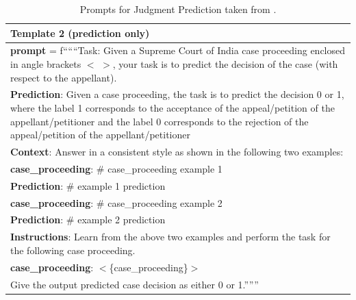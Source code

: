 \begin{table}[ht]
\begin{tabular}{|p{}|}
\hline
    {\bf Template 2 (prediction only)}\\
    \hline
   
{\bf prompt} = f``````Task: Given a Supreme Court of India case proceeding enclosed in angle brackets $<$ $>$, your task is to predict the decision of the case (with respect to the appellant).\\


{\bf Prediction}: Given a case proceeding, the task is to predict the decision 0 or 1, where the label 1 corresponds to the acceptance of the appeal/petition of the appellant/petitioner and the label 0 corresponds to the rejection of the appeal/petition of the appellant/petitioner \\


{\bf Context}: Answer in a consistent style as shown in the following two examples: \\


  {\bf case\_proceeding}: \# case\_proceeding example 1\\


  {\bf Prediction}: \# example 1 prediction \\


 


  {\bf case\_proceeding}: \# case\_proceeding example 2\\


  {\bf Prediction}: \# example 2 prediction\\


 


{\bf Instructions}: Learn from the above two examples and perform the task for the following case proceeding. \\


{\bf case\_proceeding}: $<$\{case\_proceeding\}$>$\\


Give the output predicted case decision as either 0 or 1.''''''\\

\hline

    \end{tabular}
    \caption{Prompts for Judgment Prediction taken from \cite{vats-etal-2023-llms}.}
    \label{tab:judgment_prediction_prompts_few}
\end{table}

